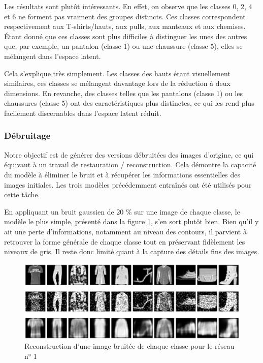 \documentclass{article}
\begin{document}
Les résultats sont plutôt intéressants. En effet, on observe que les classes 0, 2, 4 et 6 ne forment pas vraiment des groupes distincts. Ces classes correspondent respectivement aux T-shirts/hauts, aux pulls, aux manteaux et aux chemises. Étant donné que ces classes sont plus difficiles à distinguer les unes des autres que, par exemple, un pantalon (classe 1) ou une chaussure (classe 5), elles se mélangent dans l'espace latent. 

Cela s'explique très simplement. Les classes des hauts étant visuellement similaires, ces classes se mélangent davantage lors de la réduction à deux dimensions. En revanche, des classes telles que les pantalons (classe 1) ou les chaussures (classe 5) ont des caractéristiques plus distinctes, ce qui les rend plus facilement discernables dans l'espace latent réduit.


\subsubsection{Débruitage}

Notre objectif est de générer des versions débruitées des images d'origine, ce qui équivaut à un travail de restauration / reconstruction. Cela démontre la capacité du modèle à éliminer le bruit et à récupérer les informations essentielles des images initiales. Les trois modèles précédemment entraînés ont été utilisés pour cette tâche.

En appliquant un bruit gaussien de 20 \% sur une image de chaque classe, le modèle le plus simple, présenté dans la figure \ref{fig:reconstruct_noisy_all_small}, s'en sort plutôt bien. Bien qu'il y ait une perte d'informations, notamment au niveau des contours, il parvient à retrouver la forme générale de chaque classe tout en préservant fidèlement les niveaux de gris. Il reste donc limité quant à la capture des détails fins des images.

\begin{figure}[htbp]
    \centering
    \includegraphics*[width=\textwidth]{reconstruct_noisy_all_simple.pdf}
    \caption{Reconstruction d'une image bruitée de chaque classe pour le réseau n° 1}
    \label{fig:reconstruct_noisy_all_small}
\end{figure}
\end{document}
